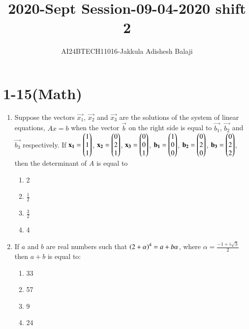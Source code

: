\documentclass[journal]{IEEEtran}
\begin{document}

\title{2020-Sept Session-09-04-2020 shift 2}
\author{AI24BTECH11016-Jakkula Adishesh Balaji}
{\let\newpage\relax\maketitle}
\renewcommand{\thefigure}{\theenumi}
\renewcommand{\thetable}{\theenumi}
\setlength{\intextsep}{10pt} %
\renewcommand{\thetable}{\theenumi}
\section{1-15(Math)}
\begin{enumerate}
	\item
	Suppose the vectors $\vec{x_1}$, $\vec{x_2}$ and $\vec{x_3}$ are the solutions of the system of linear equations, $Ax = b$ when the vector $\vec{b}$ on the right side is equal to $\vec{b_1}$, $\vec{b_2}$ and $\vec{b_3}$ respectively. If $\mathbf{x_1} = \begin{pmatrix}1 \\ 1 \\ 1\end{pmatrix}$, $\mathbf{x_2} = \begin{pmatrix}0 \\ 2 \\ 1\end{pmatrix}$, $\mathbf{x_3} = \begin{pmatrix}0 \\ 0 \\ 1\end{pmatrix}$, $\mathbf{b_1} = \begin{pmatrix}1 \\ 0 \\ 0\end{pmatrix}$, $\mathbf{b_2} = \begin{pmatrix}0 \\ 2 \\ 0\end{pmatrix}$, $\mathbf{b_3} = \begin{pmatrix}0 \\ 2 \\2\end{pmatrix}$, then the determinant of $A$ is equal to 
		\begin{enumerate}
			\item 2
			\item $\frac{1}{2}$
			\item $\frac{3}{2}$
			\item 4
		\end{enumerate}
	\item
	 If $a$ and $b$ are real numbers such that $\left(2+\alpha\right)^{4} = a+b\alpha$, where $\alpha = \frac{-1+i\sqrt{3}}{2}$ then $a+b$ is equal to:
	 	\begin{enumerate}
	 		\item 33
	 		\item 57
	 		\item 9
	 		\item 24

\end{enumerate}
\end{enumerate}
\end{document}
